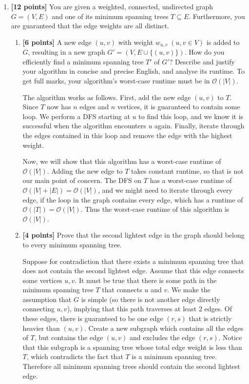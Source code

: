 \documentclass{assignment-263}
\begin{document}
\think
\begin{enumerate}
\item \textbf{[12 points]}
	You are given a weighted, connected, undirected graph $G=(V, E)$ and
    one of its minimum spanning trees $T\subseteq E$. Furthermore, you are guaranteed that the edge weights are all distinct.

    \begin{enumerate}
      \item \textbf{[6 points]}
        A new edge $(u, v)$ with weight $w_{u, v}\;(u, v\in V)$ is
        added to $G$, resulting in a new graph $G'=(V, E\cup \{(u,
        v)\})$. How do you efficiently find a minimum spanning tree
        $T'$ of $G'$? Describe and justify your algorithm in concise
        and precise English, and analyse its runtime. To get full
        marks, your algorithm's worst-case runtime must be in
        $\mathcal{O}(|V|)$.

      The algorithm works as follows. First, add the new edge \((u,v)\) to \(T\). Since \(T\) now has \(n\) edges and \(n\) vertices, it is guaranteed to contain some loop. We perform a DFS starting at \(u\) to find this loop, and we know it is successful when the algorithm encounters \(u\) again. Finally, iterate through the edges contained in this loop and remove the edge with the highest weight.

      Now, we will show that this algorithm has a worst-case runtime of \(\mathcal{O} (|V|)\). Adding the new edge to \(T\) takes constant runtime, so that is not our main point of concern. The DFS on \(T\) has a worst-case runtime of \(\mathcal{O} (|V| + |E|) = \mathcal{O} (|V|)\), and we might need to iterate through every edge, if the loop in the graph contains every edge, which has a runtime of \(\mathcal{O} (|T|) = \mathcal{O} (|V|)\). Thus the worst-case runtime of this algorithm is \(\mathcal{O} (|V|)\).

      \item \textbf{[4 points]} Prove that the second lightest edge in the graph should belong to every minimum spanning tree.
      
      Suppose for contradiction that there exists a minimum spanning tree that does not contain the second lightest edge. Assume that this edge connects some vertices \(u,v\). It must be true that there is some path in the minimum spanning tree \(T\) that connects \(u\) and \(v\). We make the assumption that \(G\) is simple (so there is not another edge directly connecting \(u,v\)), implying that this path traverses at least \(2\) edges. Of these edges, there is guaranteed to be one edge \((r,s)\) that is strictly heavier than \((u,v)\). Create a new subgraph which contains all the edges of \(T\), but contains the edge \((u,v)\) and excludes the edge \((r,s)\). Notice that this subgraph is a spanning tree whose total edge weight is less than \(T\), which contradicts the fact that \(T\) is a minimum spanning tree. Therefore all minimum spanning trees should contain the second lightest edge.
      

\end{enumerate}
\end{enumerate}
\end{document}

